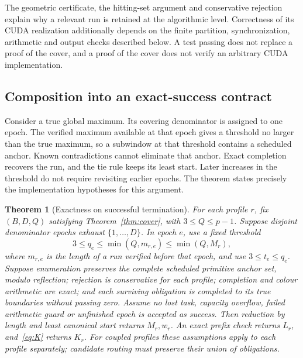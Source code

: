 \documentclass[11pt]{article}
\newtheorem{theorem}{Theorem}[section]
\theoremstyle{definition}\newtheorem{remark}[theorem]{Remark}
\begin{document}
The geometric certificate, the hitting-set argument and conservative
rejection explain why a relevant run is retained at the algorithmic level.
Correctness of its CUDA realization additionally depends on the finite
partition, synchronization, arithmetic and output checks described below.
A test passing does not replace a proof of the cover, and a proof of the
cover does not verify an arbitrary CUDA implementation.

\subsection{Composition into an exact-success contract}\label{sec:global}
Consider a true global maximum. Its covering denominator is assigned to one
epoch. The verified maximum available at that epoch gives a threshold no
larger than the true maximum, so a subwindow at that threshold contains a
scheduled anchor. Known contradictions cannot eliminate that anchor.
Exact completion recovers the run, and the tie rule keeps its least start.
Later increases in the threshold do not require revisiting earlier epochs.
The theorem states precisely the implementation hypotheses for this argument.
\begin{theorem}[Exactness on successful termination]\label{thm:global}
For each profile $r$, fix $(B,D,Q)$ satisfying
Theorem~\ref{thm:cover}, with $3\le Q\le p-1$. Suppose disjoint denominator
epochs exhaust $\{1,\ldots,D\}$. In epoch $e$, use a fixed threshold
\[
 3\le q_e\le\min(Q,m_{r,e})\le\min(Q,M_r),
\]
where $m_{r,e}$ is the length of a run verified before that epoch, and use
$3\le t_e\le q_e$. Suppose enumeration preserves the complete scheduled
primitive anchor set, modulo reflection; rejection is conservative for
each profile; completion and colour arithmetic are exact; and each
surviving obligation is completed to its true boundaries without passing
zero. Assume no lost task, capacity overflow, failed arithmetic guard or
unfinished epoch is accepted as success. Then reduction by length and
least canonical start returns $M_r,w_r$. An exact prefix check returns
$L_r$, and~\eqref{eq:K} returns $K_r$.
For coupled profiles these assumptions apply to each profile separately;
candidate routing must preserve their union of obligations.
\end{theorem}
\end{document}
